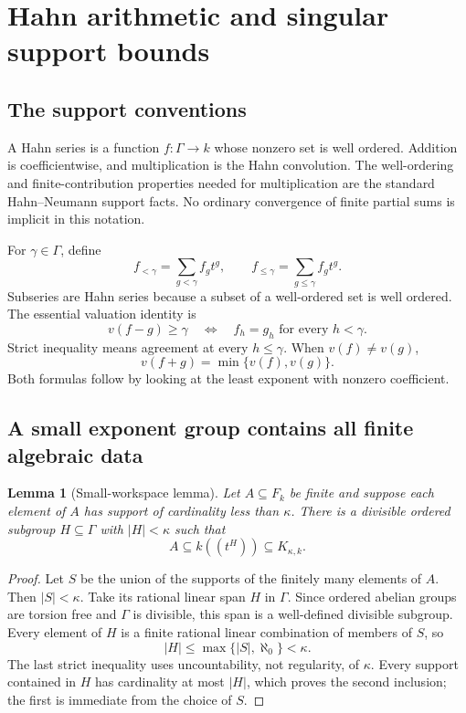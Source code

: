 \documentclass[11pt,letterpaper]{article}
\numberwithin{equation}{section}
\newtheorem{lemma}[theorem]{Lemma}
\theoremstyle{definition}
\theoremstyle{remark}
\begin{document}
\section{Hahn arithmetic and singular support bounds}
\label{fkc:sec:algebra}

\subsection{The support conventions}
A Hahn series is a function $f:\Gamma\to k$ whose nonzero set is well ordered. Addition is coefficientwise, and multiplication is the Hahn convolution. The well-ordering and finite-contribution properties needed for multiplication are the standard Hahn--Neumann support facts. No ordinary convergence of finite partial sums is implicit in this notation.

For $\gamma\in\Gamma$, define
\[
 f_{<\gamma}=\sum_{g<\gamma}f_g t^g,\qquad
 f_{\le\gamma}=\sum_{g\le\gamma}f_g t^g.
\]
Subseries are Hahn series because a subset of a well-ordered set is well ordered. The essential valuation identity is
\begin{equation}\label{fkc:eq:first-diff}
 v(f-g)\ge\gamma
 \quad\Longleftrightarrow\quad
 f_h=g_h\text{ for every }h<\gamma.
\end{equation}
Strict inequality means agreement at every $h\le\gamma$. When $v(f)\ne v(g)$,
\begin{equation}\label{fkc:eq:ultra-exact}
 v(f+g)=\min\{v(f),v(g)\}.
\end{equation}
Both formulas follow by looking at the least exponent with nonzero coefficient.

\subsection{A small exponent group contains all finite algebraic data}
\begin{lemma}[Small-workspace lemma]\label{fkc:lem:workspace}
Let $A\subseteq F_k$ be finite and suppose each element of $A$ has support of cardinality less than $\kappa$. There is a divisible ordered subgroup $H\subseteq\Gamma$ with $|H|<\kappa$ such that
\[
 A\subseteq k((t^H))\subseteq K_{\kappa,k}.
\]
\end{lemma}
\begin{proof}
Let $S$ be the union of the supports of the finitely many elements of $A$. Then $|S|<\kappa$. Take its rational linear span $H$ in $\Gamma$. Since ordered abelian groups are torsion free and $\Gamma$ is divisible, this span is a well-defined divisible subgroup. Every element of $H$ is a finite rational linear combination of members of $S$, so
\[
 |H|\le\max\{|S|,\aleph_0\}<\kappa.
\]
The last strict inequality uses uncountability, not regularity, of $\kappa$. Every support contained in $H$ has cardinality at most $|H|$, which proves the second inclusion; the first is immediate from the choice of $S$.
\end{proof}
\end{document}
